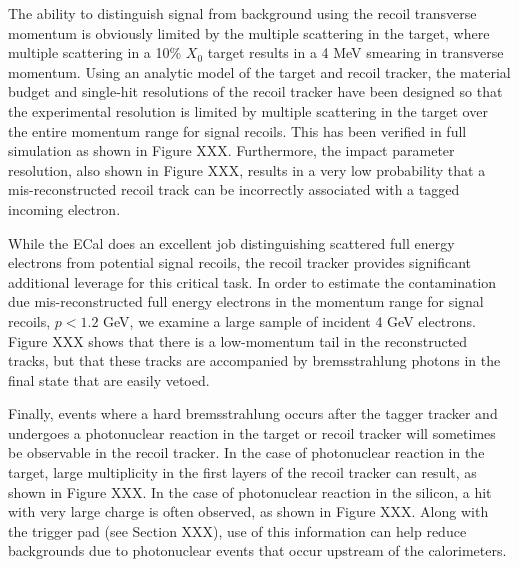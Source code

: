 The ability to distinguish signal from background using the recoil transverse momentum is obviously limited by the multiple scattering in the target, where multiple scattering in a 10\% $X_0$ target results in a 4 MeV smearing in transverse momentum.  Using an analytic model of the target and recoil tracker, the material budget and single-hit resolutions of the recoil tracker have been designed so that the experimental resolution is limited by multiple scattering in the target over the entire momentum range for signal recoils. This has been verified in full simulation as shown in Figure XXX.  Furthermore, the impact parameter resolution, also shown in Figure XXX, results in a very low probability that a mis-reconstructed recoil track can be incorrectly associated with a tagged incoming electron.  

While the ECal does an excellent job distinguishing scattered full energy electrons from potential signal recoils, the recoil tracker provides significant additional leverage for this critical task. In order to estimate the contamination due mis-reconstructed full energy electrons in the momentum range for signal recoils, $p<1.2$ GeV, we examine a large sample of incident 4 GeV electrons.  Figure XXX shows that there is a low-momentum tail in the reconstructed tracks, but that these tracks are accompanied by bremsstrahlung photons in the final state that are easily vetoed.

Finally, events where a hard bremsstrahlung occurs after the tagger tracker and undergoes a photonuclear reaction in the target or recoil tracker will sometimes be observable in the recoil tracker.  In the case of photonuclear reaction in the target, large multiplicity in the first layers of the recoil tracker can result, as shown in Figure XXX.  In the case of photonuclear reaction in the silicon, a hit with very large charge is often observed, as shown in Figure XXX.  Along with the trigger pad (see Section XXX), use of this information can help reduce backgrounds due to photonuclear events that occur upstream of the calorimeters.



